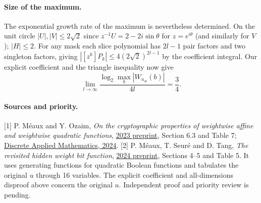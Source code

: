 \documentclass[11pt]{article}
\begin{document}
\paragraph{Size of the maximum.} The exponential growth rate of the maximum is nevertheless determined. On the unit circle $|U|,|V|\le2\sqrt2$ since $z^{-1}U=2-2i\sin\theta$ for $z=e^{i\theta}$ (and similarly for $V$); $|H|\le2$. For any mask each slice polynomial has $2l-1$ pair factors and two singleton factors, giving $|[z^k]P_k|\le4(2\sqrt2)^{2l-1}$ by the coefficient integral. Our explicit coefficient and the triangle inequality now give
\[
 \lim_{l\to\infty}\frac{\log_2\max_b|W_{u_{4l}}(b)|}{4l}=\frac34 .
\]

\paragraph{Sources and priority.}
[1] P. M\'eaux and Y. Ozaim, \emph{On the cryptographic properties of weightwise affine and weightwise quadratic functions}, \href{https://eprint.iacr.org/2023/1680}{2023 preprint}, Section 6.3 and Table 7; \href{https://doi.org/10.1016/j.dam.2024.04.008}{Discrete Applied Mathematics, 2024}.
[2] P. M\'eaux, T. Seur\'e and D. Tang, \emph{The revisited hidden weight bit function}, \href{https://eprint.iacr.org/2024/2022}{2024 preprint}, Sections 4--5 and Table 5. It uses generating functions for quadratic Boolean functions and tabulates the original $u$ through 16 variables. The explicit coefficient and all-dimensions disproof above concern the original $u$. Independent proof and priority review is pending.
\end{document}
